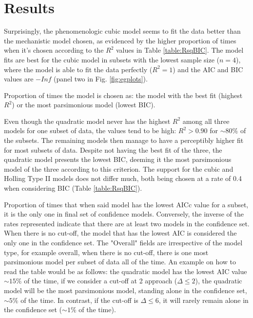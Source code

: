 \documentclass[11pt]{article}
\begin{document}
  \section{Results}
  
  Surprisingly, the phenomenologic cubic model seems to fit the data better than the mechanistic model chosen, as evidenced by the higher proportion of times when it's chosen according to the $R^2$ values in Table \ref{table:RsqBIC}. The model fits are best for the cubic model in subsets with the lowest sample size ($n=4$), where the model is able to fit the data perfectly ($R^2=1$) and the AIC and BIC values are $-Inf$ (panel two in Fig. \ref{fig:egplots}).

  \begin{table}[h]
    \centering
    \small
    \caption{Proportion of times the model is chosen as: the model with the best fit (highest $R^2$) or the most parsimonious model (lowest BIC).}
    \label{table:RsqBIC}
  \end{table}

  Even though the quadratic model never has the highest $R^2$ among all three models for one subset of data, the values tend to be high: $R^2>0.90$ for $\sim80\%$ of the subsets. The remaining models then manage to have a perceptibly higher fit for most subsets of data. Despite not having the best fit of the three, the quadratic model presents the lowest BIC, deeming it the most parsimonious model of the three according to this criterion. The support for the cubic and Holling Type II models does not differ much, both being chosen at a rate of 0.4 when considering BIC (Table \ref{table:RsqBIC}).
  
  \begin{table}[h]
    \centering
    \small
    \caption{Proportion of times that when said model has the lowest AICc value for a subset, it is the only one in final set of confidence models. Conversely, the inverse of the rates represented indicate that there are at least two models in the confidence set. When there is no cut-off, the model that has the lowest AIC is considered the only one in the confidence set. The "Overall" fields are irrespective of the model type, for example overall, when there is no cut-off, there is one most parsimonious model per subset of data all of the time. An example on how to read the table would be as follows: the quadratic model has the lowest AIC value $\sim15\%$ of the time, if we consider a cut-off at 2 approach ($\Delta\leq2$), the quadratic model will be the most parsimonious model, standing alone in the confidence set, $\sim5\%$ of the time. In contrast, if the cut-off is $\Delta\leq6$, it will rarely remain alone in the confidence set ($\sim1\%$ of the time).}
    \label{table:AIC}
  \end{table}
\end{document}

